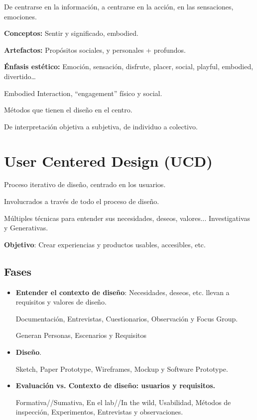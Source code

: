 \documentclass[12pt, twoside, openright]{report} %
\begin{document}
De centrarse en la información, a centrarse en la acción, en las
sensaciones, emociones.

\textbf{Conceptos:} Sentir y significado, embodied.

\textbf{Artefactos:} Propósitos sociales, y personales + profundos.

\textbf{Énfasis estético:} Emoción, sensación, disfrute, placer, social,
playful, embodied, divertido\ldots{}

Embodied Interaction, ``engagement'' físico y social.

Métodos que tienen el diseño en el centro.

De interpretación objetiva a subjetiva, de individuo a colectivo.

\section{User Centered Design (UCD)}

Proceso iterativo de diseño, centrado en los usuarios.

Involucrados a través de todo el proceso de diseño.

Múltiples técnicas para entender sus necesidades, deseos,
valores... Investigativas y Generativas.

\textbf{Objetivo}: Crear experiencias y productos usables, accesibles,
etc.
\pagebreak

\subsection{Fases}

\begin{itemize}
	\item \textbf{Entender el contexto de diseño}: Necesidades, deseos, etc.
	      llevan a requisitos y valores de diseño.

	      Documentación, Entrevistas, Cuestionarios, Observación y Focus Group.

	      Generan Personas, Escenarios y Requisitos
	\item \textbf{Diseño}.

	      Sketch, Paper Prototype, Wireframes, Mockup y Software Prototype.
	\item \textbf{Evaluación vs. Contexto de diseño: usuarios y requisitos.}

	      Formativa//Sumativa, En el lab//In the wild, Usabilidad, Métodos de
	      inspección, Experimentos, Entrevistas y observaciones.
\end{itemize}
\end{document}
